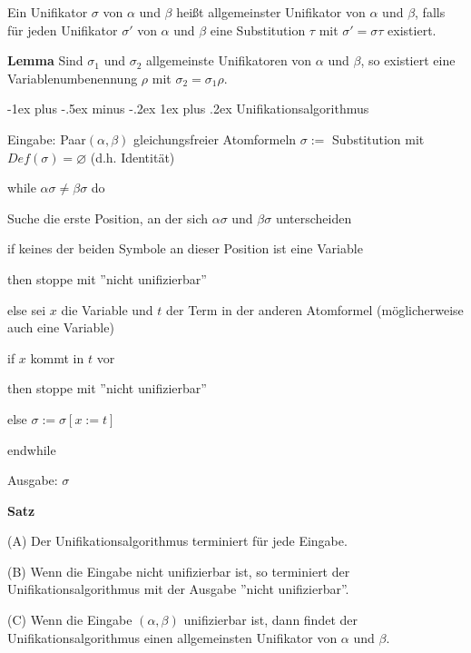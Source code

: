 \documentclass[a4paper]{article}
\makeatletter
\renewcommand{\note}[2]{\begin{noteBox} \textbf{#1} #2 \end{noteBox}}
\renewcommand{\subsubsection}{\@startsection{subsubsection}{3}{0mm}%
                {-1ex plus -.5ex minus -.2ex}%
                {1ex plus .2ex}%
                {\normalfont\small\bfseries}}
\makeatother
\begin{document}
\begin{multicols}{3}
  Ein Unifikator $\sigma$ von $\alpha$ und $\beta$ heißt allgemeinster Unifikator von $\alpha$ und $\beta$, falls für jeden Unifikator $\sigma'$ von $\alpha$ und $\beta$ eine Substitution $\tau$ mit $\sigma'=\sigma \tau$ existiert.

  \note{Lemma}{Sind $\sigma_1$ und $\sigma_2$ allgemeinste Unifikatoren von $\alpha$ und $\beta$, so existiert eine Variablenumbenennung $\rho$ mit $\sigma_2=\sigma_1 \rho$.}

  \subsubsection{Unifikationsalgorithmus}
  \begin{itemize*}
    \item Eingabe: Paar$(\alpha,\beta)$ gleichungsfreier Atomformeln $\sigma:=$ Substitution mit $Def(\sigma)=\varnothing$ (d.h. Identität)
    \item while $\alpha\sigma\not =\beta\sigma$ do
    \begin{itemize*}
      \item Suche die erste Position, an der sich $\alpha\sigma$ und $\beta\sigma$ unterscheiden
      \item if keines der beiden Symbole an dieser Position ist eine Variable
      \item then stoppe mit ''nicht unifizierbar''
      \item else sei $x$ die Variable und $t$ der Term in der anderen Atomformel (möglicherweise auch eine Variable)
      \begin{itemize*}
        \item if $x$ kommt in $t$ vor
        \item then stoppe mit ''nicht unifizierbar''
        \item else $\sigma:=\sigma[x:=t]$
      \end{itemize*}
    \end{itemize*}
    \item endwhile
    \item Ausgabe: $\sigma$
  \end{itemize*}

  \note{Satz}{
    \begin{itemize*}
      \item (A) Der Unifikationsalgorithmus terminiert für jede Eingabe.
      \item (B) Wenn die Eingabe nicht unifizierbar ist, so terminiert der Unifikationsalgorithmus mit der Ausgabe ''nicht unifizierbar''.
      \item (C) Wenn die Eingabe $(\alpha,\beta)$ unifizierbar ist, dann findet der Unifikationsalgorithmus einen allgemeinsten Unifikator von $\alpha$ und $\beta$.
    \end{itemize*}
  }


\end{multicols}
\end{document}
